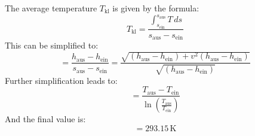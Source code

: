 The average temperature \( T_{\text{kl}} \) is given by the formula:
\[
T_{\text{kl}} = \frac{\int_{s_{\text{ein}}}^{s_{\text{aus}}} T \, ds}{s_{\text{aus}} - s_{\text{ein}}}
\]
This can be simplified to:
\[
= \frac{h_{\text{aus}} - h_{\text{ein}}}{s_{\text{aus}} - s_{\text{ein}}} = \frac{\sqrt{(h_{\text{aus}} - h_{\text{ein}}) + v^2 (h_{\text{aus}} - h_{\text{ein}})}}{\sqrt{(h_{\text{aus}} - h_{\text{ein}})}}
\]
Further simplification leads to:
\[
= \frac{T_{\text{aus}} - T_{\text{ein}}}{\ln \left( \frac{T_{\text{aus}}}{T_{\text{ein}}} \right)}
\]
And the final value is:
\[
= 293.15 \, \text{K}
\]